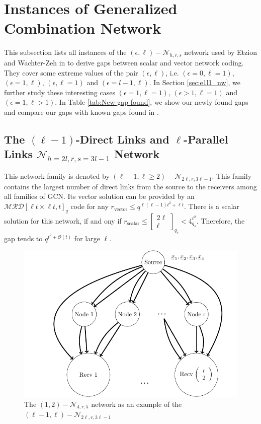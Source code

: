 \section{Instances of Generalized Combination Network}

This subsection lists all instances of the $(\epsilon,\ell)-\mathcal{N}_{h,r,s}$
network used by Etzion and Wachter-Zeh in \cite{Wachter-Zeh:2018}
to derive gaps between scalar and vector network coding. They cover
some extreme values of the pair $(\epsilon,\ell)$, i.e. $(\epsilon=0,\ell=1)$,
$(\epsilon=1,\ell)$, $(\epsilon,\ell=1)$ and $(\epsilon=l-1,\ell)$.
In Section \ref{sec:e1l1_nw}, we further study these interesting
cases $(\epsilon=1,\ell=1)$, $(\epsilon>1,\ell=1)$ and $(\epsilon=1,\ell>1)$.
In Table \ref{tab:New-gap-found}, we show our newly found gaps and
compare our gaps with known gaps found in \cite{Wachter-Zeh:2018}.

\subsection{The $(\ell-1)$-Direct Links and $\ell$-Parallel Links $\mathcal{N}_{h=2l,r,s=3l-1}$
Network}

This network family is denoted by $\left(\ell-1,\ell\geq2\right)-\mathcal{N}_{2\ell,r,3\ell-1}$.
This family contains the largest number of direct links from the source
to the receivers among all families of GCN. Its vector solution can
be provided by an $\mathcal{MRD}\left[\ell t\times\ell t,t\right]_{q}$
code for any $r_{\mathrm{vector}}\leq q^{\ell\left(\ell-1\right)t^{2}+\ell t}$.
There is a scalar solution for this network, if and ony if $r_{\mathrm{scalar}}\leq\left[\begin{array}{c}
2\ell\\
\ell
\end{array}\right]_{q_{s}}<4_{q_{s}}^{\ell^{2}}$. Therefore, the gap tends to $q^{t^{2}+\mathcal{O}\left(t\right)}$
for large $\ell$.
\begin{figure}[H]
\caption{The $\left(1,2\right)-\mathcal{N}_{4,r,5}$ network as an example
of the $\left(\ell-1,\ell\right)-\mathcal{N}_{2\ell,r,3\ell-1}$ \label{fig:network_l1e2h4rs5}}

\centering{}\includegraphics[width=0.4\paperwidth]{./figures/nw_e1_l2_h4_r_s5}
\end{figure}


